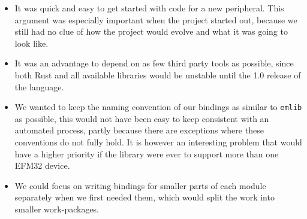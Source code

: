 \begin{itemize}
    \item It was quick and easy to get started with code for a new peripheral.
    This argument was especially important when the project started out, because we still had no clue of how the project would evolve and what it was going to look like.

    \item It was an advantage to depend on as few third party tools as possible, since both Rust and all available libraries would be unstable until the 1.0 release of the language.

    \item We wanted to keep the naming convention of our bindings as similar to \texttt{emlib} as possible, this would not have been easy to keep consistent with an automated process, partly because there are exceptions where these conventions do not fully hold.
    It is however an interesting problem that would have a higher priority if the library were ever to support more than one EFM32 device.

    \item We could focus on writing bindings for smaller parts of each module separately when we first needed them, which would split the work into smaller work-packages.
\end{itemize}

